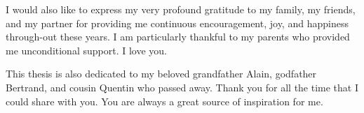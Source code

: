 I would also like to express my very profound gratitude to my family, my friends, and my partner for providing me continuous encouragement, joy, and happiness through-out these years. I am particularly thankful to my parents who provided me unconditional support. I love you.

This thesis is also dedicated to my beloved grandfather Alain, godfather Bertrand, and cousin Quentin who passed away. Thank you for all the time that I could share with you. You are always a great source of inspiration for me.

